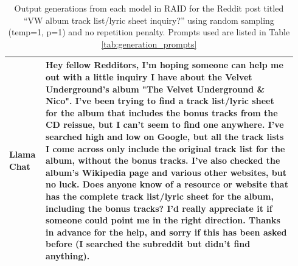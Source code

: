 \documentclass[11pt]{article}
\begin{document}
\begin{table}
\begin{tabular}{p{0.11\linewidth}|p{0.83\linewidth}}
\midrule
\textbf{Llama Chat}&Hey fellow Redditors, I'm hoping someone can help me out with a little inquiry I have about the Velvet Underground's album "The Velvet Underground \& Nico". I've been trying to find a track list/lyric sheet for the album that includes the bonus tracks from the CD reissue, but I can't seem to find one anywhere. I've searched high and low on Google, but all the track lists I come across only include the original track list for the album, without the bonus tracks. I've also checked the album's Wikipedia page and various other websites, but no luck. Does anyone know of a resource or website that has the complete track list/lyric sheet for the album, including the bonus tracks? I'd really appreciate it if someone could point me in the right direction. Thanks in advance for the help, and sorry if this has been asked before (I searched the subreddit but didn't find anything).\\
\bottomrule
\end{tabular}
\caption{Output generations from each model in RAID for the Reddit post titled ``VW album track list/lyric sheet inquiry?'' using random sampling (temp=1, p=1) and no repetition penalty. Prompts used are listed in Table \ref{tab:generation_prompts}}
\label{tab:example_generations}
\end{table}
\end{document}
